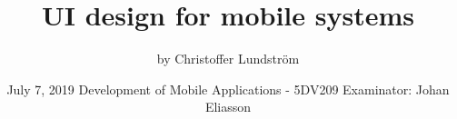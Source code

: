 \documentclass[]{article}
\begin{document}
	\begin{titlepage}
		\centering
		\title{UI design for mobile systems
		}
		\author{by Christoffer Lundström}
		\date{\centering
			July 7, 2019\endgraf\vspace{2cm}\endgraf
			Development of Mobile Applications - 5DV209\endgraf
			Examinator: Johan Eliasson\endgraf
			}
	
		\maketitle
		\thispagestyle{empty}
	\end{titlepage}
	\newpage
	\tableofcontents
	\thispagestyle{empty}
	\newpage
	
\end{document}
